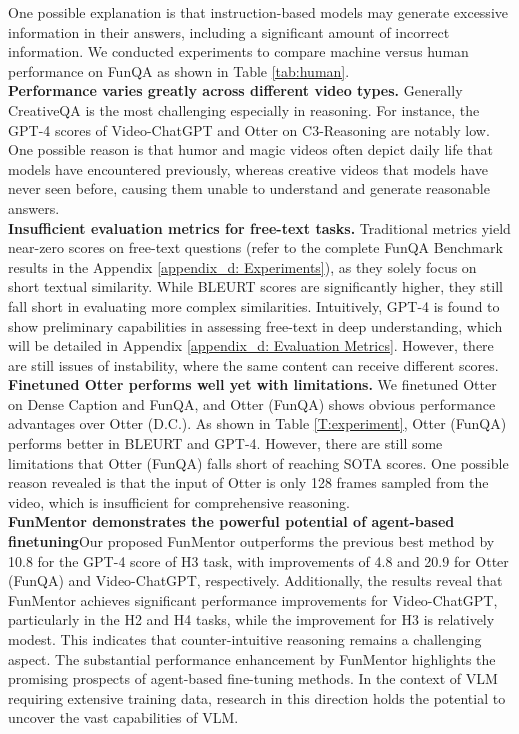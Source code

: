 One possible explanation is that instruction-based models may generate excessive information in their answers, including a significant amount of incorrect information. We conducted experiments to compare machine versus human performance on FunQA as shown in Table \ref{tab:human}.\\
\noindent\textbf{Performance varies greatly across different video types.}\quad
Generally CreativeQA is the most challenging especially in reasoning. For instance, the GPT-4 scores of Video-ChatGPT and Otter on C3-Reasoning are notably low. One possible reason is that humor and magic videos often depict daily life that models have encountered previously, whereas creative videos that models have never seen before, causing them unable to understand and generate reasonable answers.\\
\noindent\textbf{Insufficient evaluation metrics for free-text tasks.}\quad
Traditional metrics yield near-zero scores on free-text questions (refer to the complete FunQA Benchmark results in the Appendix \ref{appendix_d: Experiments}), as they solely focus on short textual similarity. While BLEURT scores are significantly higher, they still fall short in evaluating more complex similarities. Intuitively, GPT-4 is found to show preliminary capabilities in assessing free-text in deep understanding, which will be detailed in Appendix \ref{appendix_d: Evaluation Metrics}. However, there are still issues of instability, where the same content can receive different scores.\\
\noindent\textbf{Finetuned Otter performs well yet with limitations.}\quad
We finetuned Otter on Dense Caption and FunQA, and Otter (FunQA) shows obvious performance advantages over Otter (D.C.). As shown in Table \ref{T:experiment}, Otter (FunQA) performs better in BLEURT and GPT-4. However, there are still some limitations that Otter (FunQA) falls short of reaching SOTA scores. One possible reason revealed is that the input of Otter is only 128 frames sampled from the video, which is insufficient for comprehensive reasoning.\\
\noindent\textbf{FunMentor demonstrates the powerful potential of agent-based finetuning}\quad Our proposed FunMentor outperforms the previous best method by 10.8 for the GPT-4 score of H3 task, with improvements of 4.8 and 20.9 for Otter (FunQA) and Video-ChatGPT, respectively. Additionally, the results reveal that FunMentor achieves significant performance improvements for Video-ChatGPT, particularly in the H2 and H4 tasks, while the improvement for H3 is relatively modest. This indicates that counter-intuitive reasoning remains a challenging aspect. The substantial performance enhancement by FunMentor highlights the promising prospects of agent-based fine-tuning methods. In the context of VLM requiring extensive training data, research in this direction holds the potential to uncover the vast capabilities of VLM.

